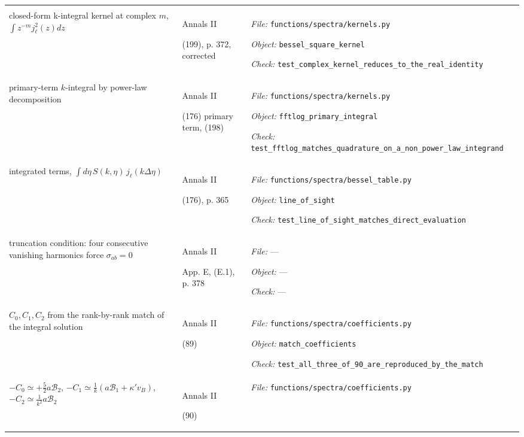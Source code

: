 \begin{landscape}
\begin{longtable}{@{}>{\raggedright\arraybackslash}p{80mm}
                     >{\raggedright\arraybackslash}p{38mm}
                     >{\raggedright\arraybackslash}p{99mm}@{}}
{\textit{Check:} \nolinkurl{test_b5_printed_201_is_short_by_the_comoving_distance}} \\
\addlinespace[2pt]
closed-form k-integral kernel at complex $m$, $\int z^{-m}j_\ell^2(z)dz$ & Annals II\par (199), p. 372, corrected & {\scriptsize \textit{File:} \nolinkurl{functions/spectra/kernels.py}\par
\textit{Object:} \nolinkurl{bessel_square_kernel}\par
\textit{Check:} \nolinkurl{test_complex_kernel_reduces_to_the_real_identity}} \\
\addlinespace[2pt]
primary-term $k$-integral by power-law decomposition & Annals II\par (176) primary term, (198) & {\scriptsize \textit{File:} \nolinkurl{functions/spectra/kernels.py}\par
\textit{Object:} \nolinkurl{fftlog_primary_integral}\par
\textit{Check:} \nolinkurl{test_fftlog_matches_quadrature_on_a_non_power_law_integrand}} \\
\addlinespace[2pt]
integrated terms, $\int d\eta\,S(k,\eta)\,j_\ell(k\Delta\eta)$ & Annals II\par (176), p. 365 & {\scriptsize \textit{File:} \nolinkurl{functions/spectra/bessel_table.py}\par
\textit{Object:} \nolinkurl{line_of_sight}\par
\textit{Check:} \nolinkurl{test_line_of_sight_matches_direct_evaluation}} \\
\addlinespace[2pt]
truncation condition: four consecutive vanishing harmonics force $\sigma_{ab}=0$ & Annals II\par App. E, (E.1), p. 378 & {\scriptsize \textit{File:} ---\par
\textit{Object:} ---\par
\textit{Check:} ---} \\
\addlinespace[2pt]
$C_0, C_1, C_2$ from the rank-by-rank match of the integral solution & Annals II\par (89) & {\scriptsize \textit{File:} \nolinkurl{functions/spectra/coefficients.py}\par
\textit{Object:} \nolinkurl{match_coefficients}\par
\textit{Check:} \nolinkurl{test_all_three_of_90_are_reproduced_by_the_match}} \\
\addlinespace[2pt]
$-C_0\simeq+\tfrac52a\mathcal{B}_2$, $-C_1\simeq\tfrac1k(a\mathcal{B}_1+\kappa'v_B)$, $-C_2\simeq\tfrac1{k^2}a\mathcal{B}_2$ & Annals II\par (90) & {\scriptsize \textit{File:} \nolinkurl{functions/spectra/coefficients.py}\par
}
\end{longtable}
\end{landscape}
